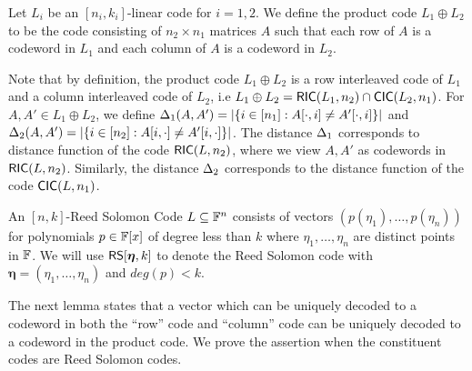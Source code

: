\begin{definition}\label{defn:productcode}
Let $L_i$ be an $[n_i,k_i]$-linear code for $i=1,2$. We define the product code $L_1\oplus L_2$ to be the code consisting of $n_2\times n_1$ matrices $A$ such that each row of $A$ is a codeword in $L_1$ and each column of $A$ is a codeword in $L_2$. 
\end{definition}

Note that by definition, the product code $L_1\oplus L_2$ is a row interleaved code of $L_1$ and a column interleaved code of $L_2$, i.e $L_1\oplus L_2 =
\mathsf{RIC}(L_1,n_2)\cap \mathsf{CIC}(L_2,n_1)$. For $A,A'\in L_1\oplus L_2$, we define $\Delta_1(A,A')=|\{i\in [n_1]: A[\cdot,i]\neq A'[\cdot,i]\}|$ and $\Delta_2(A,A')=|\{i\in
[n_2]: A[i,\cdot]\neq A'[i,\cdot]\}|$. The distance $\Delta_1$ corresponds to distance function of the code $\mathsf{RIC}(L,n_2)$, where we view $A,A'$ as codewords in $\mathsf{RIC}(L,n_2)$. Similarly, the distance $\Delta_2$ corresponds to the distance function of the code $\mathsf{CIC}(L,n_1)$.

\begin{definition}\label{defn:rscode}
An $[n,k]$-Reed Solomon Code $L\subseteq \mathbb{F}^n$ consists of vectors $(p(\eta_1),\ldots,p(\eta_n))$ for polynomials $p\in \mathbb{F}[x]$ of degree less than $k$ where $\eta_1,\ldots,\eta_n$ are distinct points in $\mathbb{F}$. We will use $\mathsf{RS}[\bm{\eta},k]$ to denote the Reed Solomon code with $\bm{\eta}=(\eta_1,\ldots,\eta_n)$ and $deg(p)<k$.
\end{definition}

The next lemma states that a vector which can be uniquely decoded to a codeword
in both the ``row'' code and ``column'' code can be uniquely decoded to a
codeword in the product code. We prove the assertion when the constituent codes
are Reed Solomon codes.
 
